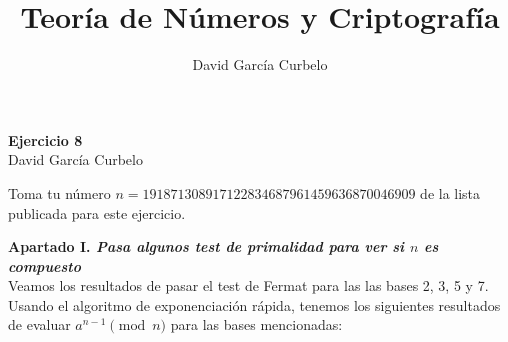 \documentclass[fleqn]{article}
\author{David García Curbelo}
\title{Teoría de Números y Criptografía}
\begin{document}
    \begin{center}
        \LARGE{\textbf{Ejercicio 8}} \\
        \Large{David García Curbelo} \\
    \end{center}

    \vspace{1cm}
    Toma tu número $n=191871308917122834687961459636870046909$ de la lista publicada para este ejercicio.


    \textbf{Apartado I. \textit{Pasa algunos test de primalidad para ver si $n$ es compuesto}}\\
    Veamos los resultados de pasar el test de Fermat para las las bases 2, 3, 5 y 7. Usando el algoritmo de exponenciación rápida, tenemos
    los siguientes resultados de evaluar $a^{n-1} \pmod{n}$ para las bases mencionadas:
\end{document}
